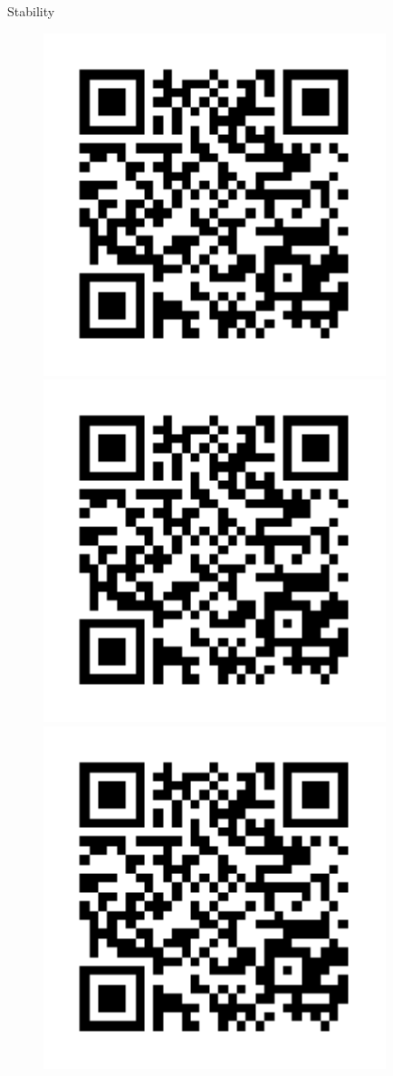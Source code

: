 
\begin{block}{Stability}

    \begin{figure}
        \includegraphics[width=10cm]{ref1}
        \includegraphics[width=10cm]{ref1}
        \includegraphics[width=10cm]{ref1}

\end{figure}
\end{block}
